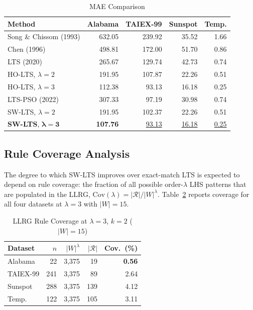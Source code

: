 \documentclass[conference]{IEEEtran}
\begin{document}
\begin{table}[htbp]
\centering
\caption{MAE Comparison}
\label{tab:mae}
\begin{tabular}{@{}lrrrr@{}}
\toprule
Method & Alabama & TAIEX-99 & Sunspot & Temp. \\
\midrule
Song \& Chissom (1993) & 632.05 & 239.92 & 35.52 & 1.66 \\
Chen (1996)            & 498.81 & 172.00 & 51.70 & 0.86 \\
LTS (2020)             & 265.67 & 129.74 & 42.73 & 0.74 \\
HO-LTS, $\lambda=2$   & 191.95 & 107.87 & 22.26 & 0.51 \\
HO-LTS, $\lambda=3$   & 112.38 &  93.13 & 16.18 & 0.25 \\
LTS-PSO (2022)         & 307.33 &  97.19 & 30.98 & 0.74 \\
\midrule
SW-LTS, $\lambda=2$   & 191.95 & 102.37 & 22.26 & 0.51 \\
\textbf{SW-LTS}, $\bm{\lambda=3}$ & \textbf{107.76} & \underline{93.13} & \underline{16.18} & \underline{0.25} \\
\bottomrule
\end{tabular}
\end{table}

\subsection{Rule Coverage Analysis}

The degree to which SW-LTS improves over exact-match LTS is expected
to depend on rule coverage: the fraction of all possible order-$\lambda$
LHS patterns that are populated in the LLRG,
$\mathrm{Cov}(\lambda) = |\mathcal{R}|/|W|^\lambda$.
Table~\ref{tab:coverage} reports coverage for all four datasets at
$\lambda=3$ with $|W|=15$.

\begin{table}[htbp]
\centering
\caption{LLRG Rule Coverage at $\lambda=3$, $k=2$ ($|W|=15$)}
\label{tab:coverage}
\begin{tabular}{@{}lrrrr@{}}
\toprule
Dataset & $n$ & $|W|^\lambda$ & $|\mathcal{R}|$ & Cov.\ (\%) \\
\midrule
Alabama   &  22 & 3{,}375 &  19 & \textbf{0.56} \\
TAIEX-99  & 241 & 3{,}375 &  89 & 2.64 \\
Sunspot   & 288 & 3{,}375 & 139 & 4.12 \\
Temp.     & 122 & 3{,}375 & 105 & 3.11 \\
\bottomrule
\end{tabular}
\end{table}
\end{document}
